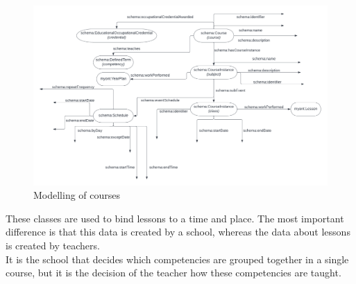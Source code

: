 \documentclass[a4paper]{report}
\begin{document}
    \begin{figure}[h]
        \caption{Modelling of courses}
        \label{fig:uml-courses}
        \includegraphics[scale=0.5]{uml-courses.png}
    \end{figure}
    \noindent These classes are used to bind lessons to a time and place. The most important difference is that this data is created by a school, whereas the data about lessons is created by teachers.\\
    It is the school that decides which competencies are grouped together in a single course, but it is the decision of the teacher how these competencies are taught.
\end{document}
